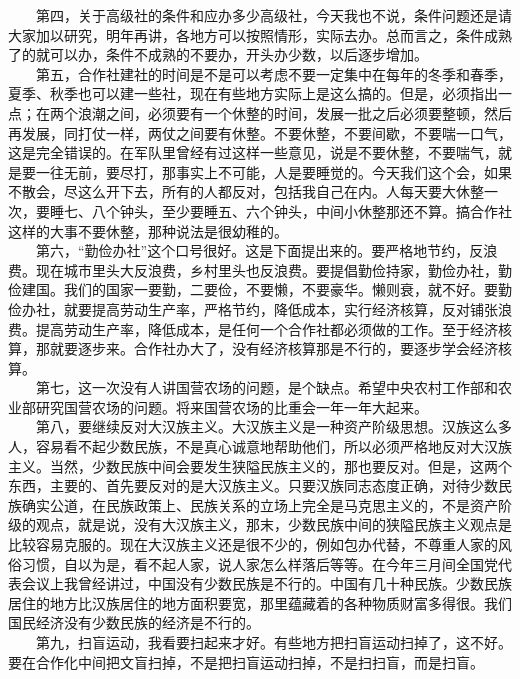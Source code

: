\documentclass[cn,11pt,chinese]{elegantbook}
\begin{document}
　　第四，关于高级社的条件和应办多少高级社，今天我也不说，条件问题还是请大家加以研究，明年再讲，各地方可以按照情形，实际去办。总而言之，条件成熟了的就可以办，条件不成熟的不要办，开头办少数，以后逐步增加。\\
　　第五，合作社建社的时间是不是可以考虑不要一定集中在每年的冬季和春季，夏季、秋季也可以建一些社，现在有些地方实际上是这么搞的。但是，必须指出一点；在两个浪潮之间，必须要有一个休整的时间，发展一批之后必须要整顿，然后再发展，同打仗一样，两仗之间要有休整。不要休整，不要间歇，不要喘一口气，这是完全错误的。在军队里曾经有过这样一些意见，说是不要休整，不要喘气，就是要一往无前，要尽打，那事实上不可能，人是要睡觉的。今天我们这个会，如果不散会，尽这么开下去，所有的人都反对，包括我自己在内。人每天要大休整一次，要睡七、八个钟头，至少要睡五、六个钟头，中间小休整那还不算。搞合作社这样的大事不要休整，那种说法是很幼稚的。\\
　　第六，“勤俭办社”这个口号很好。这是下面提出来的。要严格地节约，反浪费。现在城市里头大反浪费，乡村里头也反浪费。要提倡勤俭持家，勤俭办社，勤俭建国。我们的国家一要勤，二要俭，不要懒，不要豪华。懒则衰，就不好。要勤俭办社，就要提高劳动生产率，严格节约，降低成本，实行经济核算，反对铺张浪费。提高劳动生产率，降低成本，是任何一个合作社都必须做的工作。至于经济核算，那就要逐步来。合作社办大了，没有经济核算那是不行的，要逐步学会经济核算。\\
　　第七，这一次没有人讲国营农场的问题，是个缺点。希望中央农村工作部和农业部研究国营农场的问题。将来国营农场的比重会一年一年大起来。\\
　　第八，要继续反对大汉族主义。大汉族主义是一种资产阶级思想。汉族这么多人，容易看不起少数民族，不是真心诚意地帮助他们，所以必须严格地反对大汉族主义。当然，少数民族中间会要发生狭隘民族主义的，那也要反对。但是，这两个东西，主要的、首先要反对的是大汉族主义。只要汉族同志态度正确，对待少数民族确实公道，在民族政策上、民族关系的立场上完全是马克思主义的，不是资产阶级的观点，就是说，没有大汉族主义，那末，少数民族中间的狭隘民族主义观点是比较容易克服的。现在大汉族主义还是很不少的，例如包办代替，不尊重人家的风俗习惯，自以为是，看不起人家，说人家怎么样落后等等。在今年三月间全国党代表会议上我曾经讲过，中国没有少数民族是不行的。中国有几十种民族。少数民族居住的地方比汉族居住的地方面积要宽，那里蕴藏着的各种物质财富多得很。我们国民经济没有少数民族的经济是不行的。\\
　　第九，扫盲运动，我看要扫起来才好。有些地方把扫盲运动扫掉了，这不好。要在合作化中间把文盲扫掉，不是把扫盲运动扫掉，不是扫扫盲，而是扫盲。\\
\end{document}
